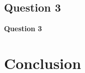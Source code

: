 \documentclass{article}
\begin{document}
\subsection{Question 3}
\noindent \textbf{Question 3}






 
\section{Conclusion}


\nocite{*}




\end{document}
